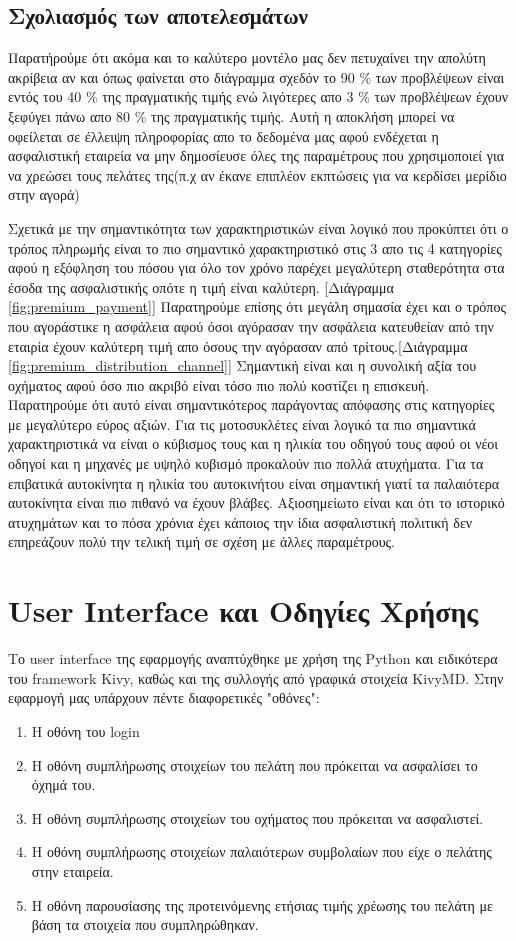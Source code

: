 \documentclass{llncs}
\begin{document}
\subsection{Σχολιασμός των αποτελεσμάτων}
\newpage
Παρατήρούμε ότι ακόμα και το καλύτερο 
μοντέλο μας δεν πετυχαίνει την απολύτη ακρίβεια αν και όπως φαίνεται
στο διάγραμμα σχεδόν το 90 \% των προβλέψεων είναι εντός του 40 \% της πραγματικής τιμής
ενώ λιγότερες απο 3 \% των προβλέψεων έχουν ξεφύγει πάνω απο 80 \% της πραγματικής τιμής.
Αυτή η αποκλήση μπορεί να οφείλεται σε έλλειψη πληροφορίας απο το δεδομένα μας αφού ενδέχεται
η ασφαλιστική εταιρεία να μην δημοσίευσε όλες της παραμέτρους που χρησιμοποιεί για να 
χρεώσει τους πελάτες της(π.χ αν έκανε επιπλέον εκπτώσεις για να κερδίσει μερίδιο στην αγορά)

Σχετικά με την σημαντικότητα των χαρακτηριστικών είναι λογικό που προκύπτει ότι ο τρόπος πληρωμής 
είναι το πιο σημαντικό χαρακτηριστικό στις 3 απο τις 4 κατηγορίες αφού η εξόφληση του πόσου
για όλο τον χρόνο παρέχει μεγαλύτερη σταθερότητα στα έσοδα της ασφαλιστικής οπότε η τιμή είναι
καλύτερη. [Διάγραμμα \ref{fig:premium_payment}]
Παρατηρούμε επίσης ότι μεγάλη σημασία έχει και ο τρόπος που αγοράστικε η ασφάλεια αφού 
όσοι αγόρασαν την ασφάλεια κατευθείαν από την εταιρία έχουν καλύτερη τιμή απο όσους την 
αγόρασαν από τρίτους.[Διάγραμμα \ref{fig:premium_distribution_channel}]
Σημαντική είναι και η συνολική αξία του οχήματος αφού όσο πιο ακριβό είναι τόσο πιο πολύ
κοστίζει η επισκευή. Παρατηρούμε ότι αυτό είναι σημαντικότερος παράγοντας απόφασης στις
κατηγορίες με μεγαλύτερο εύρος αξιών.
Για τις μοτοσυκλέτες είναι λογικό 
τα πιο σημαντικά χαρακτηριστικά να είναι ο κύβισμος τους και η ηλικία του οδηγού τους αφού
οι νέοι οδηγοί και η μηχανές με υψηλό κυβισμό προκαλούν πιο πολλά ατυχήματα.
Για τα επιβατικά αυτοκίνητα η ηλικία του αυτοκινήτου είναι σημαντική γιατί τα παλαιότερα αυτοκίνητα
είναι πιο πιθανό να έχουν βλάβες.
Αξιοσημείωτο είναι και ότι το ιστορικό ατυχημάτων και το πόσα χρόνια έχει κάποιος την 
ίδια ασφαλιστική πολιτική δεν επηρεάζουν πολύ την τελική τιμή 
σε σχέση με άλλες παραμέτρους.


\section{User Interface και Οδηγίες Χρήσης}
Το user interface της εφαρμογής αναπτύχθηκε με χρήση της Python και ειδικότερα του framework Kivy, καθώς και της συλλογής από γραφικά στοιχεία KivyMD. Στην εφαρμογή μας υπάρχουν πέντε διαφορετικές "οθόνες":
\begin{enumerate}
    \item Η οθόνη του login
    \item Η οθόνη συμπλήρωσης στοιχείων του πελάτη που πρόκειται να ασφαλίσει το όχημά του.
    \item Η οθόνη συμπλήρωσης στοιχείων του οχήματος που πρόκειται να ασφαλιστεί.
    \item Η οθόνη συμπλήρωσης στοιχείων παλαιότερων συμβολαίων που είχε ο πελάτης στην εταιρεία.
    \item Η οθόνη παρουσίασης της προτεινόμενης ετήσιας τιμής χρέωσης του πελάτη με βάση τα στοιχεία που συμπληρώθηκαν.
\end{enumerate}
\end{document}
